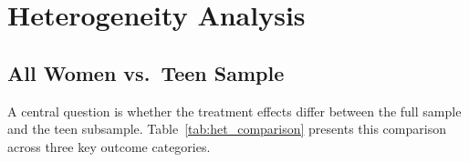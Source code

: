\documentclass[12pt,a4paper]{article}
\begin{document}
\section{Heterogeneity Analysis}

\subsection{All Women vs.\ Teen Sample}

A central question is whether the treatment effects differ between the full sample and the teen subsample. Table~\ref{tab:het_comparison} presents this comparison across three key outcome categories.
\vspace{0.25cm}
\end{document}
